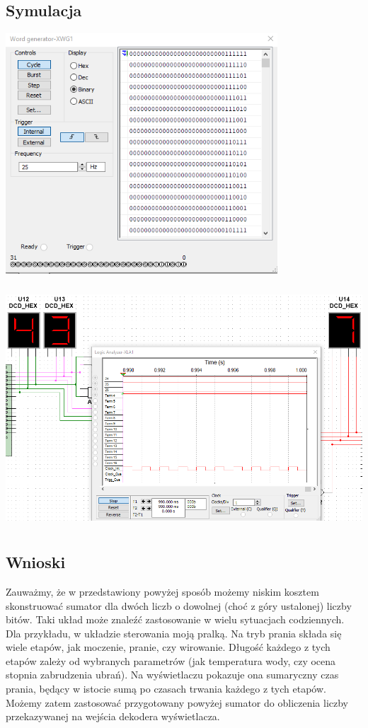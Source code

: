 \documentclass{article}
\begin{document}
        \subsection{Symulacja}
            \begin{center}
                \includegraphics[height=9cm]{reports/img/Z1A_gen.png}\\
            \end{center}
            \begin{center}
                \includegraphics[height=9cm]{reports/img/Z1A_analize.png}\\
            \end{center}

            
        \subsection{Wnioski}
            Zauważmy, że w przedstawiony powyżej sposób możemy niskim kosztem skonstruować sumator dla dwóch liczb o dowolnej (choć z góry ustalonej) liczby bitów. Taki układ może znaleźć zastosowanie w wielu sytuacjach codziennych. Dla przykładu, w układzie sterowania moją pralką. Na tryb prania składa się wiele etapów, jak moczenie, pranie, czy wirowanie. Długość każdego z tych etapów zależy od wybranych parametrów (jak temperatura wody, czy ocena stopnia zabrudzenia ubrań). Na wyświetlaczu pokazuje ona sumaryczny czas prania, będący w istocie sumą po czasach trwania każdego z tych etapów. Możemy zatem zastosować przygotowany powyżej sumator do obliczenia liczby przekazywanej na wejścia dekodera wyświetlacza. 
            
\end{document}
